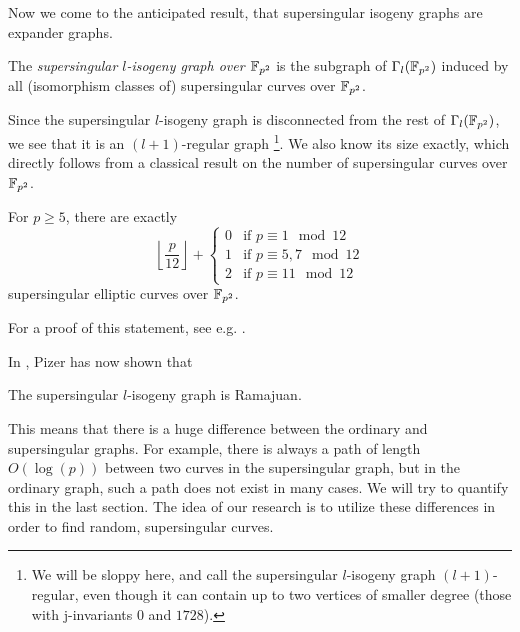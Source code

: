 Now we come to the anticipated result, that supersingular isogeny graphs are expander graphs.
\begin{definition}
    The \emph{supersingular $l$-isogeny graph over $\mathbb{F}_{p^2}$} is the subgraph of $\Gamma_l(\mathbb{F}_{p^2})$ induced by all (isomorphism classes of) supersingular curves over $\mathbb{F}_{p^2}$.
\end{definition}
Since the supersingular $l$-isogeny graph is disconnected from the rest of $\Gamma_l(\mathbb{F}_{p^2})$, we see that it is an $(l + 1)$-regular graph
\footnote{We will be sloppy here, and call the supersingular $l$-isogeny graph $(l + 1)$-regular, even though it can contain up to two vertices of smaller degree (those with j-invariants $0$ and $1728$).}.
We also know its size exactly, which directly follows from a classical result on the number of supersingular curves over $\mathbb{F}_{p^2}$.
\begin{prop}
    For $p \geq 5$, there are exactly
    \begin{equation*}
        \left\lfloor \frac p {12} \right\rfloor + \begin{cases}
            0 & \text{if $p \equiv 1 \mod 12$} \\
            1 & \text{if $p \equiv 5, 7 \mod 12$} \\
            2 & \text{if $p \equiv 11 \mod 12$}
        \end{cases}
    \end{equation*}
    supersingular elliptic curves over $\mathbb{F}_{p^2}$.
\end{prop}
For a proof of this statement, see e.g. \cite[Thm~V.4.1]{arithmetic_elliptic_curves}.

In \cite{supersingular_graphs_ramajuan}, Pizer has now shown that
\begin{theorem}
    \label{prop:supersingular_graph_ramajuan}
    The supersingular $l$-isogeny graph is Ramajuan.
\end{theorem}
This means that there is a huge difference between the ordinary and supersingular graphs.
For example, there is always a path of length $O(\log(p))$ between two curves in the supersingular graph, but in the ordinary graph, such a path does not exist in many cases.
We will try to quantify this in the last section.
The idea of our research is to utilize these differences in order to find random, supersingular curves.

